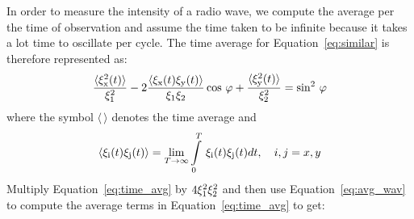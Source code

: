 In order to measure the intensity of a radio wave, we compute the average per the time of observation and  assume the time taken to be infinite because 
it takes a lot time to oscillate per cycle. The time average for Equation~\ref{eq:similar} is therefore represented as:
%
\begin{equation}
  \begin{aligned}
   \frac{\langle \xi_{\rm x}^{2}(t)\rangle}{\xi_{\rm 1}^{2}} - 2 \frac{\langle \xi_{\rm x}(t)\xi_{\rm y}(t)\rangle}{\xi_{\rm 1}\xi_{\rm 2}}\cos\, \varphi  +
   \frac{\langle \xi_{\rm y}^{2}(t)\rangle}{\xi_{\rm 2}^{2}}  = \sin^{2}\, \varphi 
   \end{aligned}
  \label{eq:time_avg}
 \end{equation} 
%
where the symbol $\langle \, \rangle$ denotes the time average and 
%
\begin{equation}
  \begin{aligned}
   \langle \xi_{\rm i}(t)\xi_{\rm j}(t)\rangle = \lim_{T \to \infty} \int\limits_0^T \, \xi_{\rm i}(t)\xi_{\rm j}(t) dt, \quad i, j = x, y
  \end{aligned}
  \label{eq:avg_wav}
 \end{equation} 
%
% 
Multiply Equation~\ref{eq:time_avg} by $4\xi_{\rm 1}^{2}\xi_{\rm 2}^{2}$  and then use Equation~\ref{eq:avg_wav} to compute the average terms in Equation~\ref{eq:time_avg} to get:

